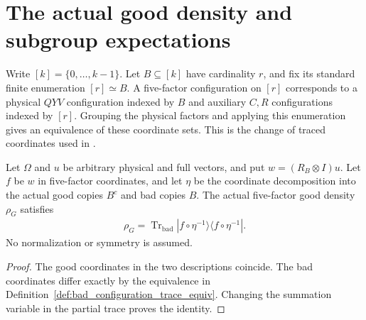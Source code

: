 \section{The actual good density and subgroup expectations}
\label{sec:replica_good_configuration_expectation}

\begin{definition}
\label{def:bad_configuration_trace_equiv}
\leanok
Write $[k]=\{0,\ldots,k-1\}$. Let $B\subseteq[k]$ have cardinality $r$, and fix its standard finite
enumeration $[r]\simeq B$. A five-factor configuration on $[r]$
corresponds to a physical $QYV$ configuration indexed by $B$ and
auxiliary $C,R$ configurations indexed by $[r]$. Grouping the physical
factors and applying this enumeration gives an equivalence of these
coordinate sets. This is the change of traced coordinates used in
\cite[Section~8, lines~520--549]{OpenAI2026AreaLaw}.
\end{definition}

\begin{theorem}
\label{thm:replica_good_configuration_grouped_density}
\leanok
Let $\Omega$ and $u$ be arbitrary physical and full vectors, and put
$w=(R_B\otimes I)u$. Let $f$ be $w$ in five-factor coordinates,
and let $\eta$ be the coordinate decomposition into the actual good
copies $B^c$ and bad copies $B$. The actual five-factor good density
$\rho_G$ satisfies
\begin{align*}
 \rho_G=\operatorname{Tr}_{\mathrm{bad}}
       |f\circ\eta^{-1}\rangle\langle f\circ\eta^{-1}|.
\end{align*}
No normalization or symmetry is assumed.
\end{theorem}
\begin{proof}\leanok
{}
The good coordinates in the two descriptions coincide. The bad
coordinates differ exactly by the equivalence in
Definition~\ref{def:bad_configuration_trace_equiv}. Changing the
summation variable in the partial trace proves the identity.
\end{proof}

